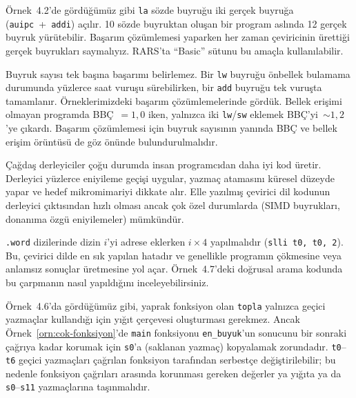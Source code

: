 
Örnek~4.2'de gördüğümüz gibi \texttt{la} sözde buyruğu iki gerçek buyruğa (\texttt{auipc}~+~\texttt{addi}) açılır. 10 sözde buyruktan oluşan bir program aslında 12 gerçek buyruk yürütebilir. Başarım çözümlemesi yaparken her zaman çeviricinin ürettiği gerçek buyrukları saymalıyız. RARS'ta ``Basic'' sütunu bu amaçla kullanılabilir.


Buyruk sayısı tek başına başarımı belirlemez. Bir \texttt{lw} buyruğu önbellek bulamama durumunda yüzlerce saat vuruşu sürebilirken, bir \texttt{add} buyruğu tek vuruşta tamamlanır. Örneklerimizdeki başarım çözümlemelerinde gördük. Bellek erişimi olmayan programda BBÇ~$= 1{,}0$ iken, yalnızca iki \texttt{lw}/\texttt{sw} eklemek BBÇ'yi~$\sim 1{,}2$'ye çıkardı. Başarım çözümlemesi için buyruk sayısının yanında BBÇ ve bellek erişim örüntüsü de göz önünde bulundurulmalıdır.


Çağdaş derleyiciler çoğu durumda insan programcıdan daha iyi kod üretir. Derleyici yüzlerce eniyileme geçişi uygular, yazmaç atamasını küresel düzeyde yapar ve hedef mikromimariyi dikkate alır. Elle yazılmış çevirici dil kodunun derleyici çıktısından hızlı olması ancak çok özel durumlarda (SIMD buyrukları, donanıma özgü eniyilemeler) mümkündür.


\texttt{.word} dizilerinde dizin $i$'yi adrese eklerken $i \times 4$ yapılmalıdır (\texttt{slli t0, t0, 2}). Bu, çevirici dilde en sık yapılan hatadır ve genellikle programın çökmesine veya anlamsız sonuçlar üretmesine yol açar. Örnek~4.7'deki doğrusal arama kodunda bu çarpmanın nasıl yapıldığını inceleyebilirsiniz.


Örnek~4.6'da gördüğümüz gibi, yaprak fonksiyon olan \texttt{topla} yalnızca geçici yazmaçlar kullandığı için yığıt çerçevesi oluşturması gerekmez. Ancak Örnek~\ref{orn:cok-fonksiyon}'de \texttt{main} fonksiyonu \texttt{en\_buyuk}'un sonucunu bir sonraki çağrıya kadar korumak için \texttt{s0}'a (saklanan yazmaç) kopyalamak zorundadır. \texttt{t0}--\texttt{t6} geçici yazmaçları çağrılan fonksiyon tarafından serbestçe değiştirilebilir; bu nedenle fonksiyon çağrıları arasında korunması gereken değerler ya yığıta ya da \texttt{s0}--\texttt{s11} yazmaçlarına taşınmalıdır.

